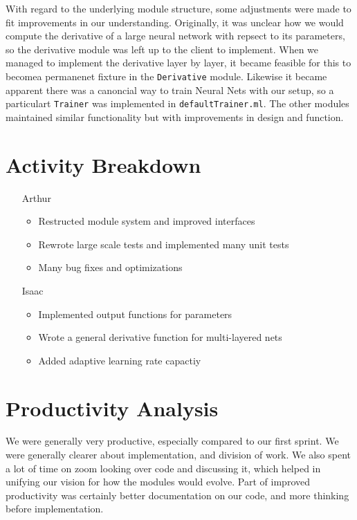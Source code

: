 \documentclass{article}
\begin{document}
With regard to the underlying module structure, some adjustments were made to fit improvements in our understanding.  Originally, it was unclear how we would compute the derivative of a large neural network with repsect to its parameters, so the derivative module was left up to the client to implement.  When we managed to implement the derivative layer by layer, it became feasible for this to becomea permanenet fixture in the \texttt{Derivative} module.  Likewise it became apparent there was a canoncial way to train Neural Nets with our setup, so a particulart \texttt{Trainer} was implemented in \texttt{defaultTrainer.ml}.  The other modules maintained similar functionality but with improvements in design and function.    
\section{Activity Breakdown}
\label{sec:activity}

\begin{itemize}[leftmargin=2cm]

\item[Arthur]
	\begin{itemize}
	
	\item Restructed module system and improved interfaces 
	\item Rewrote large scale tests and implemented many unit tests
	\item Many bug fixes and optimizations

	\end{itemize}

\item[Isaac]
	\begin{itemize}
	
	\item Implemented output functions for parameters
	\item Wrote a general derivative function for multi-layered nets
	\item Added adaptive learning rate capactiy
	
	\end{itemize}

\end{itemize}

\section{Productivity Analysis}
\label{sec:productivity}

We were generally very productive, especially compared to our first sprint.  We were generally clearer about implementation, and division of work.  We also spent a lot of time on zoom looking over code and discussing it, which helped in unifying our vision for how the modules would evolve.  Part of improved productivity was certainly better documentation on our code, and more thinking before implementation.  
\end{document}
